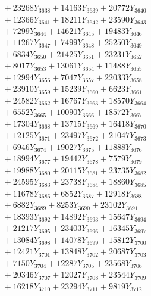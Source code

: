 \documentclass[a4paper,10pt]{article}
\begin{document}
{\begin{align}
&\;  + 23268 Y_{3638} + 14163 Y_{3639} + 20772 Y_{3640} \\[0.3ex]
&\;  + 12366 Y_{3641} + 18211 Y_{3642} + 23590 Y_{3643} \\[0.3ex]
&\;  + 7299 Y_{3644} + 14621 Y_{3645} + 19483 Y_{3646} \\[0.3ex]
&\;  + 11267 Y_{3647} + 7499 Y_{3648} + 25250 Y_{3649} \\[0.3ex]
&\;  + 6834 Y_{3650} + 21425 Y_{3651} + 23231 Y_{3652} \\[0.3ex]
&\;  + 8017 Y_{3653} + 13061 Y_{3654} + 11488 Y_{3655} \\[0.3ex]
&\;  + 12994 Y_{3656} + 7047 Y_{3657} + 22033 Y_{3658} \\[0.5ex]\allowbreak
&\;  + 23910 Y_{3659} + 15239 Y_{3660} + 6623 Y_{3661} \\[0.3ex]
&\;  + 24582 Y_{3662} + 16767 Y_{3663} + 18570 Y_{3664} \\[0.3ex]
&\;  + 6552 Y_{3665} + 10090 Y_{3666} + 18572 Y_{3667} \\[0.3ex]
&\;  + 17304 Y_{3668} + 13715 Y_{3669} + 16418 Y_{3670} \\[0.3ex]
&\;  + 12125 Y_{3671} + 23497 Y_{3672} + 21047 Y_{3673} \\[0.3ex]
&\;  + 6946 Y_{3674} + 19027 Y_{3675} + 11888 Y_{3676} \\[0.3ex]
&\;  + 18994 Y_{3677} + 19442 Y_{3678} + 7579 Y_{3679} \\[0.3ex]
&\;  + 19988 Y_{3680} + 20115 Y_{3681} + 23735 Y_{3682} \\[0.3ex]
&\;  + 24595 Y_{3683} + 23738 Y_{3684} + 18860 Y_{3685} \\[0.3ex]
&\;  + 11678 Y_{3686} + 6852 Y_{3687} + 12918 Y_{3688} \\[0.5ex]\allowbreak
&\;  + 6882 Y_{3689} + 8253 Y_{3690} + 23102 Y_{3691} \\[0.3ex]
&\;  + 18393 Y_{3692} + 14892 Y_{3693} + 15647 Y_{3694} \\[0.3ex]
&\;  + 21217 Y_{3695} + 23403 Y_{3696} + 16345 Y_{3697} \\[0.3ex]
&\;  + 13084 Y_{3698} + 14078 Y_{3699} + 15812 Y_{3700} \\[0.3ex]
&\;  + 12421 Y_{3701} + 13848 Y_{3702} + 20687 Y_{3703} \\[0.3ex]
&\;  + 7150 Y_{3704} + 12287 Y_{3705} + 23568 Y_{3706} \\[0.3ex]
&\;  + 20346 Y_{3707} + 12027 Y_{3708} + 23544 Y_{3709} \\[0.3ex]
&\;  + 16218 Y_{3710} + 23294 Y_{3711} + 9819 Y_{3712} \\[0.3ex]

\end{align}}
\end{document}
